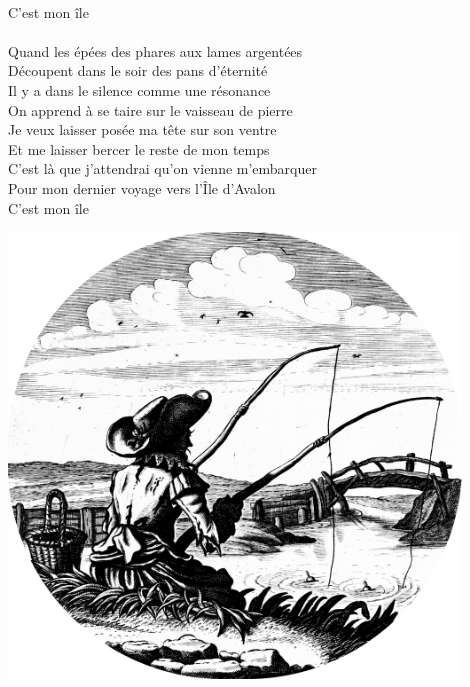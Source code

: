 \\C’est mon île \bissimple
\breakpage
\\\\Quand les épées des phares aux lames argentées
\\Découpent dans le soir des pans d’éternité
\\Il y a dans le silence comme une résonance
\\On apprend à se taire sur le vaisseau de pierre
\\Je veux laisser posée ma tête sur son ventre
\\Et me laisser bercer le reste de mon temps
\\C’est là que j'attendrai qu’on vienne m’embarquer
\\Pour mon dernier voyage vers l’Île d’Avalon
\\C’est mon île \bissimple
\bigskip
\bigskip
\bigskip
\begin{center}
\includegraphics[width=0.9\textwidth]{images/brev41.png}
\end{center}
\breakpage